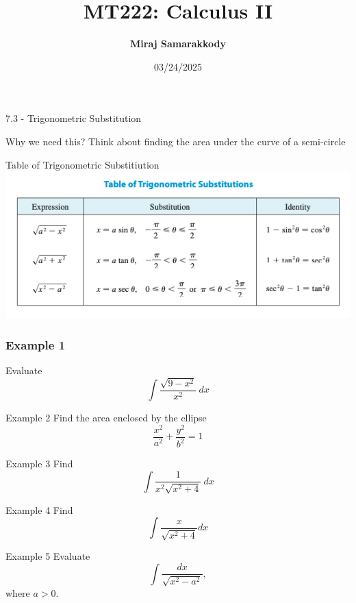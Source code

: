 \documentclass{beamer}
\title{MT222: Calculus II}
\author{\textbf{Miraj Samarakkody}}
\institute{Tougaloo College}
\date{03/24/2025}
\begin{document}
\begin{frame}
    \titlepage
\end{frame}




\begin{frame}{}
    \begin{center}
        \Huge{7.3 - Trigonometric Substitution}
    \end{center}
    
\end{frame}

\begin{frame}{Why we need this?}
    Think about finding the area under the curve of a semi-circle
\end{frame}

\begin{frame}{Table of Trigonometric Substitiution}
    \includegraphics[scale=0.6]{figures/fig_1.png}
\end{frame}

\begin{frame}
    \frametitle{Example 1}
Evaluate \[\int \dfrac{\sqrt{9-x^2}}{x^2}~dx\]
\end{frame}

\begin{frame}{Example 2}
    Find the area enclosed by the ellipse \[\dfrac{x^2}{a^2}+ \dfrac{y^2}{b^2}=1\]
\end{frame}

\begin{frame}{Example 3}
    Find \[\int \dfrac{1}{x^2 \sqrt{x^2+4}}~dx\]
\end{frame}

\begin{frame}{Example 4}
    Find \[\int \dfrac{x}{\sqrt{x^2+4}}dx\]
\end{frame}

\begin{frame}{Example 5}
    Evaluate \[\int \dfrac{dx}{\sqrt{x^2-a^2}},\] where \(a>0\).
    
\end{frame}
\end{document}
